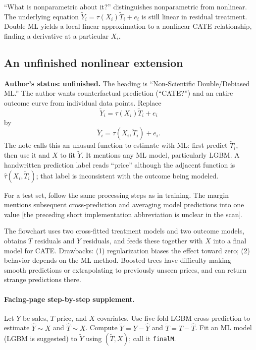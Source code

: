 {``What is nonparametric about it?'' distinguishes nonparametric from nonlinear. The underlying equation $\widetilde Y_i=\tau(X_i)\widetilde T_i+e_i$ is still linear in residual treatment. Double ML yields a local linear approximation to a nonlinear CATE relationship, finding a derivative at a particular $X_i$.

\subsection{An unfinished nonlinear extension}
\textbf{Author's status: unfinished.} The heading is ``Non-Scientific Double/Debiased ML.'' The author wants counterfactual prediction (``CATE?'') and an entire outcome curve from individual data points. Replace
\[\widetilde Y_i=\tau(X_i)\widetilde T_i+e_i\]
by
\[\widetilde Y_i=\tau(X_i,\widetilde T_i)+e_i.\]
The note calls this an unusual function to estimate with ML: first predict $\widetilde T_i$, then use it and $X$ to fit $\widetilde Y$. It mentions any ML model, particularly LGBM. A handwritten prediction label reads ``price'' although the adjacent function is $\hat\tau(X_i,\widetilde T_i)$; that label is inconsistent with the outcome being modeled.

For a test set, follow the same processing steps as in training. The margin mentions subsequent cross-prediction and averaging model predictions into one value [the preceding short implementation abbreviation is unclear in the scan].

The flowchart uses two cross-fitted treatment models and two outcome models, obtains $T$ residuals and $Y$ residuals, and feeds these together with $X$ into a final model for CATE. Drawbacks: (1) regularization biases the effect toward zero; (2) behavior depends on the ML method. Boosted trees have difficulty making smooth predictions or extrapolating to previously unseen prices, and can return strange predictions there.

\paragraph{Facing-page step-by-step supplement.}
Let $Y$ be sales, $T$ price, and $X$ covariates. Use five-fold LGBM cross-prediction to estimate $\hat Y\sim X$ and $\hat T\sim X$. Compute $\widetilde Y=Y-\hat Y$ and $\widetilde T=T-\hat T$. Fit an ML model (LGBM is suggested) to $\widetilde Y$ using $(\widetilde T,X)$; call it \texttt{finalM}.

}
